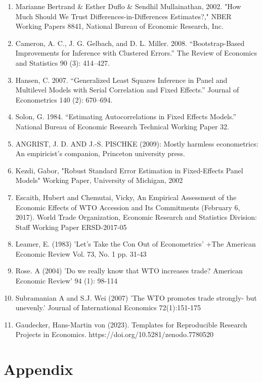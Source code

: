 \documentclass[11pt, a4paper, leqno]{article}
\begin{document}
\begin{enumerate}
    \item Marianne Bertrand \& Esther Duflo \& Sendhil Mullainathan, 2002. "How Much Should We Trust Differences-in-Differences Estimates?," NBER Working Papers 8841, National Bureau of Economic Research, Inc.
    \item Cameron, A. C., J. G. Gelbach, and D. L. Miller. 2008. “Bootstrap-Based Improvements for Inference with Clustered Errors.” The Review of Economics and Statistics 90 (3): 414–427.
    \item Hansen, C. 2007. “Generalized Least Squares Inference in Panel and Multilevel Models with Serial Correlation and Fixed Effects.” Journal of Econometrics 140 (2): 670–694.
    \item Solon, G. 1984. “Estimating Autocorrelations in Fixed Effects Models.” National Bureau of Economic Research Technical Working Paper 32.
    \item ANGRIST, J. D. AND J.-S. PISCHKE (2009): Mostly harmless econometrics: An empiricist's companion, Princeton university press.
    \item Kezdi, Gabor, "Robust Standard Error Estimation in Fixed-Effects Panel Models" Working Paper, University of Michigan, 2002
    \item Escaith, Hubert and Chemutai, Vicky, An Empirical Assessment of the Economic Effects of WTO Accession and Its Commitments (February 6, 2017). World Trade Organization, Economic Research and Statistics Division: Staff Working Paper ERSD-2017-05
    \item Leamer, E. (1983) 'Let's Take the Con Out of Econometrics' +The American Economic Review Vol. 73, No. 1 pp. 31-43
    \item Rose. A (2004) 'Do we really know that WTO increases trade? American Economic Review' 94 (1): 98-114
    \item Subramanian A and S.J. Wei (2007) 'The WTO promotes trade strongly- but unevenly.' Journal of International Economics 72(1):151-175
    \item Gaudecker, Hans-Martin von (2023). Templates for Reproducible Research Projects in Economics. https://doi.org/10.5281/zenodo.7780520
\end{enumerate}

\clearpage

\section{Appendix}
\label{sec:appendix}
\end{document}
